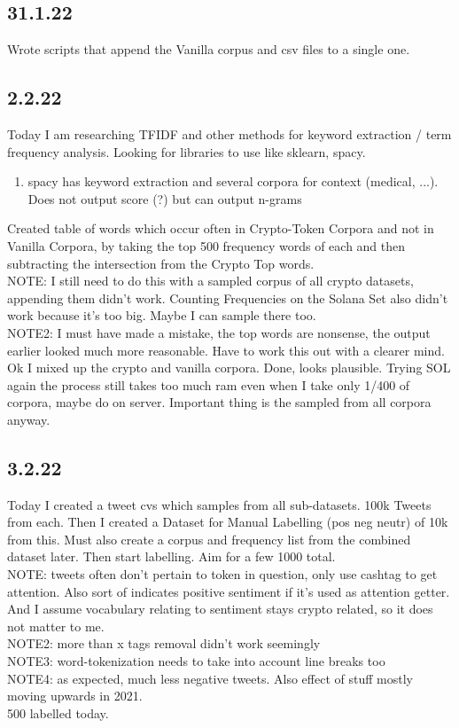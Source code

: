 \subsection{31.1.22}
Wrote scripts that append the Vanilla corpus and csv files to a single one. 

\subsection{2.2.22}
Today I am researching TFIDF and other methods for keyword extraction / term frequency analysis. Looking for libraries to use like sklearn, spacy.
\begin{enumerate}
    \item spacy has keyword extraction and several corpora for context (medical, ...). Does not output score (?) but can output n-grams
\end{enumerate}

Created table of words which occur often in Crypto-Token Corpora and not in Vanilla Corpora, by taking the top 500 frequency words of each and then subtracting the intersection from the Crypto Top words. \\
NOTE: I still need to do this with a sampled corpus of all crypto datasets, appending them didn't work. Counting Frequencies on the Solana Set also didn't work because it's too big. Maybe I can sample there too. \\
NOTE2: I must have made a mistake, the top words are nonsense, the output earlier looked much more reasonable. Have to work this out with a clearer mind. Ok I mixed up the crypto and vanilla corpora. Done, looks plausible.
Trying SOL again the process still takes too much ram even when I take only 1/400 of corpora, maybe do on server. Important thing is the sampled from all corpora anyway.

\subsection{3.2.22}
Today I created a tweet cvs which samples from all sub-datasets. 100k Tweets from each. Then I created a Dataset for Manual Labelling (pos neg neutr) of 10k from this. Must also create a corpus and frequency list from the combined dataset later. Then start labelling. Aim for a few 1000 total. \\
NOTE: tweets often don't pertain to token in question, only use cashtag to get attention. Also sort of indicates positive sentiment if it's used as attention getter. And I assume vocabulary relating to sentiment stays crypto related, so it does not matter to me. \\
NOTE2: more than x tags removal didn't work seemingly \\
NOTE3: word-tokenization needs to take into account line breaks too \\
NOTE4: as expected, much less negative tweets. Also effect of stuff mostly moving upwards in 2021. \\
500 labelled today.


